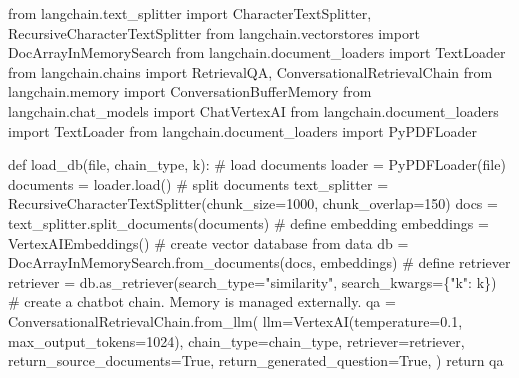 \documentclass[
  letterpaper,
  DIV=11,
  numbers=noendperiod]{scrreprt}
\newenvironment{Shaded}{\begin{snugshade}}{\end{snugshade}}
\newcommand{\BuiltInTok}[1]{\textcolor[rgb]{0.00,0.23,0.31}{#1}}
\newcommand{\CommentTok}[1]{\textcolor[rgb]{0.37,0.37,0.37}{#1}}
\newcommand{\ControlFlowTok}[1]{\textcolor[rgb]{0.00,0.23,0.31}{#1}}
\newcommand{\DecValTok}[1]{\textcolor[rgb]{0.68,0.00,0.00}{#1}}
\newcommand{\FloatTok}[1]{\textcolor[rgb]{0.68,0.00,0.00}{#1}}
\newcommand{\ImportTok}[1]{\textcolor[rgb]{0.00,0.46,0.62}{#1}}
\newcommand{\KeywordTok}[1]{\textcolor[rgb]{0.00,0.23,0.31}{#1}}
\newcommand{\NormalTok}[1]{\textcolor[rgb]{0.00,0.23,0.31}{#1}}
\newcommand{\OperatorTok}[1]{\textcolor[rgb]{0.37,0.37,0.37}{#1}}
\newcommand{\StringTok}[1]{\textcolor[rgb]{0.13,0.47,0.30}{#1}}
\newcommand{\VariableTok}[1]{\textcolor[rgb]{0.07,0.07,0.07}{#1}}
\begin{document}
\begin{Shaded}
\begin{Highlighting}[]
\ImportTok{from}\NormalTok{ langchain.text\_splitter }\ImportTok{import}\NormalTok{ CharacterTextSplitter, RecursiveCharacterTextSplitter}
\ImportTok{from}\NormalTok{ langchain.vectorstores }\ImportTok{import}\NormalTok{ DocArrayInMemorySearch}
\ImportTok{from}\NormalTok{ langchain.document\_loaders }\ImportTok{import}\NormalTok{ TextLoader}
\ImportTok{from}\NormalTok{ langchain.chains }\ImportTok{import}\NormalTok{ RetrievalQA,  ConversationalRetrievalChain}
\ImportTok{from}\NormalTok{ langchain.memory }\ImportTok{import}\NormalTok{ ConversationBufferMemory}
\ImportTok{from}\NormalTok{ langchain.chat\_models }\ImportTok{import}\NormalTok{ ChatVertexAI}
\ImportTok{from}\NormalTok{ langchain.document\_loaders }\ImportTok{import}\NormalTok{ TextLoader}
\ImportTok{from}\NormalTok{ langchain.document\_loaders }\ImportTok{import}\NormalTok{ PyPDFLoader}
\end{Highlighting}
\end{Shaded}

\begin{Shaded}
\begin{Highlighting}[]
\KeywordTok{def}\NormalTok{ load\_db(}\BuiltInTok{file}\NormalTok{, chain\_type, k):}
    \CommentTok{\# load documents}
\NormalTok{    loader }\OperatorTok{=}\NormalTok{ PyPDFLoader(}\BuiltInTok{file}\NormalTok{)}
\NormalTok{    documents }\OperatorTok{=}\NormalTok{ loader.load()}
    \CommentTok{\# split documents}
\NormalTok{    text\_splitter }\OperatorTok{=}\NormalTok{ RecursiveCharacterTextSplitter(chunk\_size}\OperatorTok{=}\DecValTok{1000}\NormalTok{, chunk\_overlap}\OperatorTok{=}\DecValTok{150}\NormalTok{)}
\NormalTok{    docs }\OperatorTok{=}\NormalTok{ text\_splitter.split\_documents(documents)}
    \CommentTok{\# define embedding}
\NormalTok{    embeddings }\OperatorTok{=}\NormalTok{ VertexAIEmbeddings()}
    \CommentTok{\# create vector database from data}
\NormalTok{    db }\OperatorTok{=}\NormalTok{ DocArrayInMemorySearch.from\_documents(docs, embeddings)}
    \CommentTok{\# define retriever}
\NormalTok{    retriever }\OperatorTok{=}\NormalTok{ db.as\_retriever(search\_type}\OperatorTok{=}\StringTok{"similarity"}\NormalTok{, search\_kwargs}\OperatorTok{=}\NormalTok{\{}\StringTok{"k"}\NormalTok{: k\})}
    \CommentTok{\# create a chatbot chain. Memory is managed externally.}
\NormalTok{    qa }\OperatorTok{=}\NormalTok{ ConversationalRetrievalChain.from\_llm(}
\NormalTok{        llm}\OperatorTok{=}\NormalTok{VertexAI(temperature}\OperatorTok{=}\FloatTok{0.1}\NormalTok{, max\_output\_tokens}\OperatorTok{=}\DecValTok{1024}\NormalTok{),}
\NormalTok{        chain\_type}\OperatorTok{=}\NormalTok{chain\_type,}
\NormalTok{        retriever}\OperatorTok{=}\NormalTok{retriever,}
\NormalTok{        return\_source\_documents}\OperatorTok{=}\VariableTok{True}\NormalTok{,}
\NormalTok{        return\_generated\_question}\OperatorTok{=}\VariableTok{True}\NormalTok{,}
\NormalTok{    )}
    \ControlFlowTok{return}\NormalTok{ qa}
\end{Highlighting}
\end{Shaded}
\end{document}
